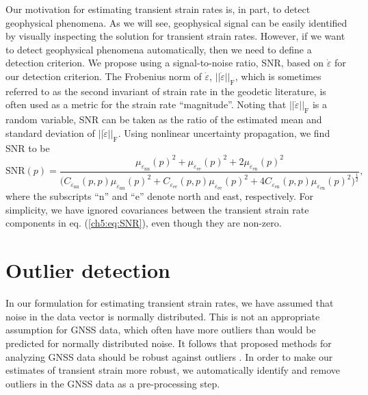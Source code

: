 Our motivation for estimating transient strain rates is, in part, to detect geophysical phenomena. As we will see, geophysical signal can be easily identified by visually inspecting the solution for transient strain rates. However, if we want to detect geophysical phenomena automatically, then we need to define a detection criterion. We propose using a signal-to-noise ratio, SNR, based on $\dot\varepsilon$ for our detection criterion. The Frobenius norm of $\dot\varepsilon$, $||\dot\varepsilon||_\mathrm{F}$, which is sometimes referred to as the second invariant of strain rate in the geodetic literature, is often used as a metric for the strain rate ``magnitude''. Noting that $||\dot\varepsilon||_\mathrm{F}$ is a random variable, SNR can be taken as the ratio of the estimated mean and standard deviation of $||\dot\varepsilon||_\mathrm{F}$. Using nonlinear uncertainty propagation, we find SNR to be  
\begin{equation}\label{ch5:eq:SNR}
\mathrm{SNR}(p) = \frac{\mu_{\dot\varepsilon_\mathrm{nn}}(p)^2 +
                        \mu_{\dot\varepsilon_\mathrm{ee}}(p)^2 +
                        2\mu_{\dot\varepsilon_\mathrm{en}}(p)^2}
                       {\big(C_{\dot\varepsilon_\mathrm{nn}}(p,p)\mu_{\dot\varepsilon_\mathrm{nn}}(p)^2 + 
                              C_{\dot\varepsilon_\mathrm{ee}}(p,p)\mu_{\dot\varepsilon_\mathrm{ee}}(p)^2 + 
                              4C_{\dot\varepsilon_\mathrm{en}}(p,p)\mu_{\dot\varepsilon_\mathrm{en}}(p)^2
                        \big)^{\frac{1}{2}}}
,
\end{equation}
where the subscripts ``n'' and ``e'' denote north and east, respectively. For simplicity, we have ignored covariances between the transient strain rate components in eq. (\ref{ch5:eq:SNR}), even though they are non-zero.  

\section{Outlier detection}\label{ch5:sec:Outlier}
In our formulation for estimating transient strain rates, we have assumed that noise in the data vector is normally distributed. This is not an appropriate assumption for GNSS data, which often have more outliers than would be predicted for normally distributed noise. It follows that proposed methods for analyzing GNSS data should be robust against outliers \citep[e.g.,][]{Blewitt2016}. In order to make our estimates of transient strain more robust, we automatically identify and remove outliers in the GNSS data as a pre-processing step.


